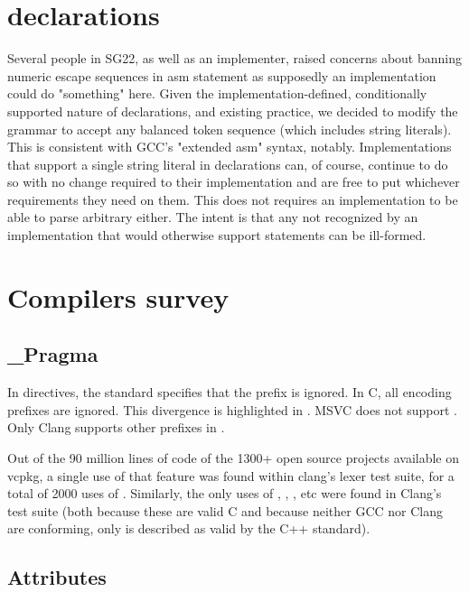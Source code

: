 \documentclass{wg21}
\begin{document}
\section{ declarations}

Several people in SG22, as well as an implementer, raised concerns about banning numeric escape sequences
in asm statement as supposedly an implementation could do "something" here.
Given the implementation-defined, conditionally supported nature of  declarations, and existing practice, we decided to modify the grammar to accept any balanced token sequence (which includes string literals).
This is consistent with GCC's "extended asm" syntax, notably.
Implementations that support a single string literal in  declarations can, of course, continue to do so with no change required to their
implementation and are free to put whichever requirements they need on them.
This does not requires an implementation to be able to parse arbitrary  either.
The intent is that any  not recognized by an implementation that would otherwise support  statements
can be ill-formed.

\section{Compilers survey}

\subsection{_Pragma}

In  directives, the standard specifies that the  prefix is ignored.
In C, all encoding prefixes are ignored. This divergence is highlighted in .
MSVC does not support .  Only Clang supports other prefixes in .

Out of the 90 million lines of code of the 1300+ open source projects available on vcpkg, a
single use of that feature was found within clang’s lexer test suite, for a total of 2000 uses
of . Similarly, the only uses of , , , etc were
found in Clang’s test suite (both because these are valid C and because neither GCC nor Clang
are conforming, only  is described as valid by the C++ standard).

\subsection{Attributes}
\end{document}
